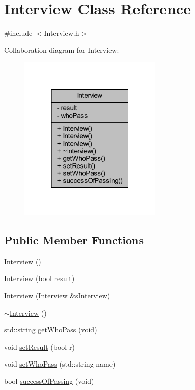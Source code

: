 \hypertarget{class_interview}{}\section{Interview Class Reference}
\label{class_interview}


{\ttfamily \#include $<$Interview.\+h$>$}



Collaboration diagram for Interview\+:
\nopagebreak
\begin{figure}[H]
\begin{center}
\leavevmode
\includegraphics[width=193pt]{class_interview__coll__graph}
\end{center}
\end{figure}
\subsection*{Public Member Functions}
\begin{DoxyCompactItemize}
\item 
\hyperlink{class_interview_a18c238c7fd5e7a118b0cd41f35f93360}{Interview} ()
\item 
\hyperlink{class_interview_aedb4e2b612dd1c811957eeba48e7cff2}{Interview} (bool \hyperlink{class_interview_aa456226f23acfdb23a6c94eab33e3cbb}{result})
\item 
\hyperlink{class_interview_a5910c3f8fd63842d118ffde49bce514b}{Interview} (\hyperlink{class_interview}{Interview} \&s\+Interview)
\item 
\hyperlink{class_interview_a5d38984d9695b62a2e4aabcf5295810c}{$\sim$\+Interview} ()
\item 
std\+::string \hyperlink{class_interview_adef4bd6cdccfc2a3e610ee2ef2489dcd}{get\+Who\+Pass} (void)
\item 
void \hyperlink{class_interview_abbd0885e4e3823bb65951cc0bb647d6b}{set\+Result} (bool r)
\item 
void \hyperlink{class_interview_ae7b385238b18a719812f41ea96040c3e}{set\+Who\+Pass} (std\+::string name)
\item 
bool \hyperlink{class_interview_a20d7ee5c6fd7c030857b21c39b1d1e1b}{success\+Of\+Passing} (void)
\end{DoxyCompactItemize}
